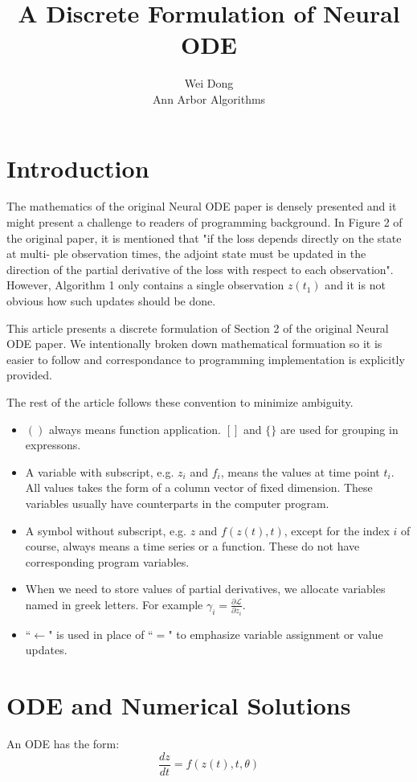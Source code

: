 \documentclass{article}
\title{A Discrete Formulation of Neural ODE}
\author{Wei Dong\\Ann Arbor Algorithms}
\newcommand{\LL}{{\mathcal L}}
\begin{document}
\maketitle
\section{Introduction}

The mathematics
of the original Neural ODE paper is densely presented and it might present a
challenge to readers of programming background.  In Figure 2 of the original
paper, it is mentioned that "if the loss depends directly on the state at
multi- ple observation times, the adjoint state must be updated in the
direction of the partial derivative of the loss with respect to each
observation".  However, Algorithm 1 only contains a single observation $z(t_1)$
and it is not obvious how such updates should be done.

This article presents a discrete formulation of Section 2 of the original
Neural ODE paper.  We intentionally broken down mathematical formuation so it is
easier to follow and correspondance to programming implementation is explicitly provided.

The rest of the article follows these convention to minimize ambiguity.
\begin{itemize}
	\item $( )$ always means function application.  $[]$ and $\{\}$ are used for grouping in expressons.
	\item A variable with subscript, e.g. $z_i$ and $f_i$, means the values at time point $t_i$.  All values takes the form of a column vector of fixed dimension.  These variables usually have counterparts in the computer program.
	\item A symbol without subscript, e.g. $z$ and $f(z(t), t)$, except for the index $i$ of course, always means a time series or a function.  These do not have corresponding program variables.
	\item When we need to store values of partial derivatives, we allocate variables named in greek letters.  For example $\gamma_i = \frac{\partial \LL}{\partial z_i}$.
	\item ``$\leftarrow$" is used in place of ``$=$" to emphasize variable assignment or value updates.
\end{itemize}
\section{ODE and Numerical Solutions}
An ODE has the form:
\begin{equation}
\label{eq:ode}
\frac{dz}{dt} = f(z(t), t, \theta)
\end{equation}
\end{document}
